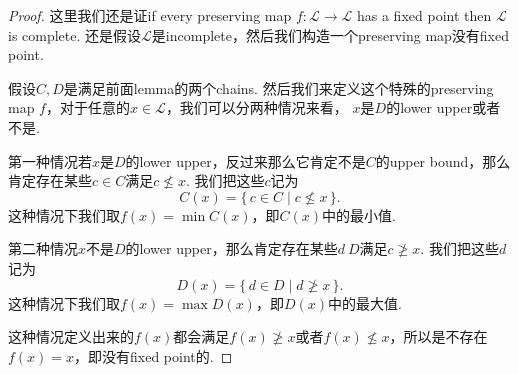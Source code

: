 \documentclass{article}
\newcommand*{\xfunc}[4]{{#2}\colon{#3}{#1}{#4}}
\newcommand*{\func}[3]{\xfunc{\to}{#1}{#2}{#3}}
\newcommand\Set[2]{\{\,#1\mid#2\,\}} %
\newcommand\lattice{\mathcal{L}}
\begin{document}
\begin{proof}
这里我们还是证if every preserving map $\func{f}{\lattice}{\lattice}$ has a fixed point then $\lattice$ is complete. 还是假设$\lattice$是incomplete，然后我们构造一个preserving map没有fixed point.

假设$C,D$是满足前面lemma的两个chains. 然后我们来定义这个特殊的preserving map $f$，对于任意的$x \in \lattice$，我们可以分两种情况来看，{\color{blue} $x$是$D$的lower upper或者不是}. 

第一种情况若$x$是$D$的lower upper，反过来那么它肯定不是$C$的upper bound，那么肯定存在某些$c \in C$满足$c \nleq x$. 我们把这些$c$记为
$$
C(x) = \Set{c \in C}{c \nleq x}.
$$
这种情况下我们取$f(x) = \min C(x)$，即$C(x)$中的最小值.

第二种情况$x$不是$D$的lower upper，那么肯定存在某些$d \ D$满足$c \ngeq x$. 我们把这些$d$记为
$$
D(x) = \Set{d \in D}{d \ngeq x}.
$$
这种情况下我们取$f(x) = \max D(x)$，即$D(x)$中的最大值.

这种情况定义出来的$f(x)$都会满足$f(x) \ngeq x$或者$f(x) \nleq x$，所以是不存在$f(x) = x$，即没有fixed point的.


\end{proof}
\end{document}
